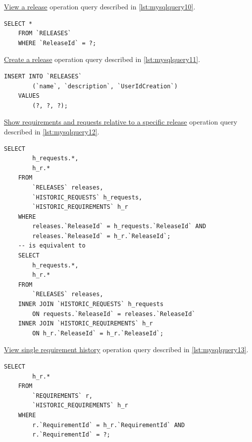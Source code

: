 \documentclass[12pt, a4paper]{report}
\begin{document}
\hyperref[subsubsec:op10]{View a release} operation query described in \autoref{lst:mysqlquery10}.

\begin{lstlisting}[language=MySQL, caption={\texorpdfstring{\hyperref[subsubsec:op10]{op. 10}}{op. 10}}, label={lst:mysqlquery10}]
    SELECT *
    FROM `RELEASES`
    WHERE `ReleaseId` = ?;
\end{lstlisting}

\hyperref[subsubsec:op11]{Create a release} operation query described in \autoref{lst:mysqlquery11}.

\begin{lstlisting}[language=MySQL, caption={\texorpdfstring{\hyperref[subsubsec:op11]{op. 11}}{op. 11}}, label={lst:mysqlquery11}]
    INSERT INTO `RELEASES`
        (`name`, `description`, `UserIdCreation`)
    VALUES
        (?, ?, ?);
\end{lstlisting}

\hyperref[subsubsec:op12]{Show requirements and requests relative to a specific release} operation query described in
\autoref{lst:mysqlquery12}.

\begin{lstlisting}[language=MySQL, caption={\texorpdfstring{\hyperref[subsubsec:op12]{op. 12}}{op. 12}}, label={lst:mysqlquery12}]
    SELECT
        h_requests.*,
        h_r.*
    FROM
        `RELEASES` releases,
        `HISTORIC_REQUESTS` h_requests,
        `HISTORIC_REQUIREMENTS` h_r
    WHERE
        releases.`ReleaseId` = h_requests.`ReleaseId` AND
        releases.`ReleaseId` = h_r.`ReleaseId`;
    -- is equivalent to
    SELECT
        h_requests.*,
        h_r.*
    FROM
        `RELEASES` releases,
    INNER JOIN `HISTORIC_REQUESTS` h_requests
        ON requests.`ReleaseId` = releases.`ReleaseId`
    INNER JOIN `HISTORIC_REQUIREMENTS` h_r
        ON h_r.`ReleaseId` = h_r.`ReleaseId`;
\end{lstlisting}

\hyperref[subsubsec:op13]{View single requirement history} operation query described in \autoref{lst:mysqlquery13}.

\begin{lstlisting}[language=MySQL, caption={\texorpdfstring{\hyperref[subsubsec:op13]{op. 13}}{op. 13}}, label={lst:mysqlquery13}]
    SELECT
        h_r.*
    FROM
        `REQUIREMENTS` r,
        `HISTORIC_REQUIREMENTS` h_r
    WHERE
        r.`RequirementId` = h_r.`RequirementId` AND
        r.`RequirementId` = ?;
\end{lstlisting}
\end{document}
